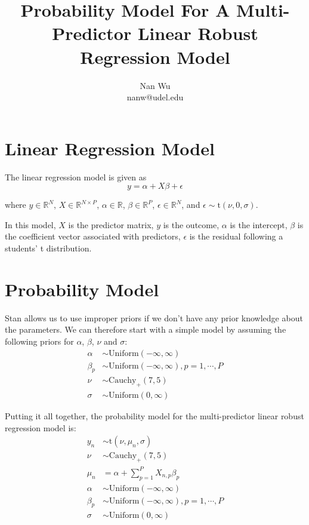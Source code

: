 \documentclass[12pt]{article}
\begin{document}
\title{Probability Model For A Multi-Predictor Linear Robust Regression Model}
\author{Nan Wu \\ nanw@udel.edu}
\date{}
\maketitle

\section{Linear Regression Model}

The linear regression model is given as
\begin{equation}
y=\alpha+X\beta+\epsilon
\end{equation}

where $y\in \mathbb{R}^N$, $X\in \mathbb{R}^{N \times P}$, $\alpha \in \mathbb{R}$, $\beta \in \mathbb{R}^P$, $\epsilon \in \mathbb{R}^N$, and $\epsilon \sim \mathrm{t}\left( \nu,0,\sigma \right)$.

In this model, $X$ is the predictor matrix, $y$ is the outcome, $\alpha$ is the intercept, $\beta$ is the coefficient vector associated with predictors, $\epsilon$ is the residual following a students' t distribution.

\section{Probability Model}

Stan allows us to use improper priors if we don't have any prior knowledge about the parameters. We can therefore start with a simple model by assuming the following priors for $\alpha$, $\beta$, $\nu$ and $\sigma$:
\begin{align*}
\alpha &\sim \mathrm{Uniform}\left( -\infty,\infty \right) \\
\beta_p &\sim \mathrm{Uniform}\left( -\infty,\infty \right), p=1,\cdots,P \\
\nu &\sim \mathrm{Cauchy}_+\left(7,5 \right) \\
\sigma &\sim \mathrm{Uniform}\left( 0,\infty \right)
\end{align*}

Putting it all together, the probability model for the multi-predictor linear robust regression model is:
\begin{align*}
y_n &\sim \mathrm{t}\left(\nu, \mu_n, \sigma \right) \\
\nu &\sim \mathrm{Cauchy}_+\left(7,5 \right) \\
\mu_n &= \alpha + \sum\limits_{p=1}^P X_{n,p}\beta_p \\
\alpha &\sim \mathrm{Uniform}\left( -\infty,\infty \right) \\
\beta_p &\sim \mathrm{Uniform}\left( -\infty,\infty \right), p=1,\cdots,P \\
\sigma &\sim \mathrm{Uniform}\left( 0,\infty \right)
\end{align*}
\end{document}
